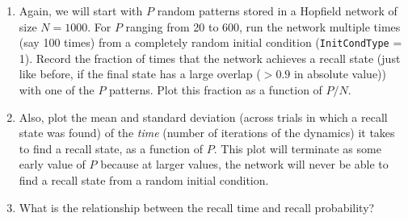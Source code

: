 \documentclass[letterpaper,11pt]{article}
\begin{document}
\begin{enumerate}
  \item Again, we will start with $P$ random patterns stored in a Hopfield network of size $N=1000$. For $P$ ranging from 20 to 600, run the network multiple times (say 100 times) from a completely random initial condition (\texttt{InitCondType} = 1). Record the fraction of times that the network achieves a recall state (just like before, if the final state has a large overlap ($> 0.9$ in absolute value)) with one of the $P$ patterns. Plot this fraction as a function of $P/N$.
  \item Also, plot the mean and standard deviation (across trials in which a recall state was found) of the \textit{time} (number of iterations of the dynamics) it takes to find a recall state, as a function of $P$. This plot will terminate as some early value of $P$ because at larger values, the network will never be able to find a recall state from a random initial condition.
  \item What is the relationship between the recall time and recall probability?
\end{enumerate}



\end{document}

